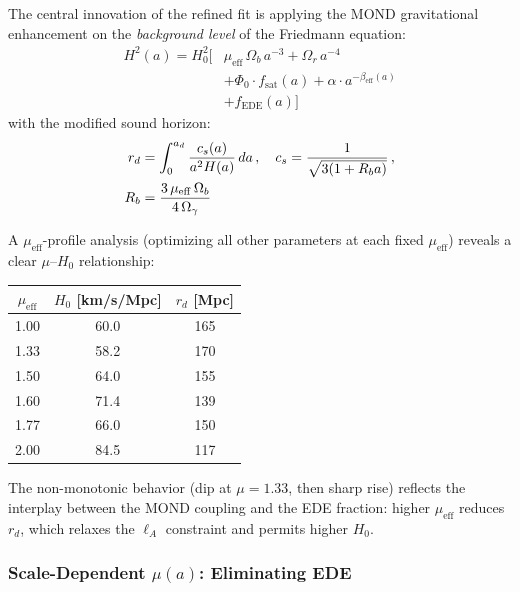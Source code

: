 \documentclass[aps,prd,twocolumn,superscriptaddress,nofootinbib]{revtex4-2}
\begin{document}
The central innovation of the refined fit is applying the MOND gravitational enhancement on the \textit{background level} of the Friedmann equation:
\begin{equation}
\begin{split}
H^2(a) = H_0^2 \Big[&\mu_{\mathrm{eff}}\,\Omega_b\,a^{-3} + \Omega_r\,a^{-4} \\
&+ \Phi_0 \cdot f_{\mathrm{sat}}(a) + \alpha \cdot a^{-\beta_{\mathrm{eff}}(a)} \\
&+ f_{\mathrm{EDE}}(a)\Big]
\end{split}
\label{eq:mond_friedmann}
\end{equation}
with the modified sound horizon:
\begin{align}
r_d &= \int_0^{a_d} \frac{c_s(a)}{a^2 H(a)} \, da\,,\quad c_s = \frac{1}{\sqrt{3(1 + R_b a)}}\,,\notag\\
R_b &= \frac{3\,\mu_{\mathrm{eff}}\,\Omega_b}{4\,\Omega_\gamma}
\label{eq:mond_rs}
\end{align}

A $\mu_{\mathrm{eff}}$-profile analysis (optimizing all other parameters at each fixed $\mu_{\mathrm{eff}}$) reveals a clear $\mu$--$H_0$ relationship:

\begin{center}
\begin{tabular}{ccc}
\toprule
$\mu_{\mathrm{eff}}$ & $H_0$ [km/s/Mpc] & $r_d$ [Mpc] \\
\midrule
1.00 & 60.0 & 165 \\
1.33 & 58.2 & 170 \\
1.50 & 64.0 & 155 \\
1.60 & 71.4 & 139 \\
1.77 & 66.0 & 150 \\
2.00 & 84.5 & 117 \\
\bottomrule
\end{tabular}
\end{center}

The non-monotonic behavior (dip at $\mu = 1.33$, then sharp rise) reflects the interplay between the MOND coupling and the EDE fraction: higher $\mu_{\mathrm{eff}}$ reduces $r_d$, which relaxes the $\ell_A$ constraint and permits higher $H_0$.

\subsubsection{Scale-Dependent $\mu(a)$: Eliminating EDE}
\label{subsubsec:mu_scale}
\end{document}
